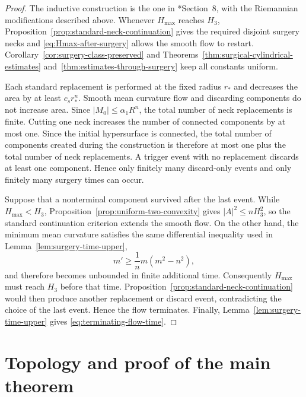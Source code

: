 \documentclass[11pt,reqno]{amsart}
\theoremstyle{definition}
\theoremstyle{remark}
\numberwithin{equation}{section}
\begin{document}
\begin{proof}
  The inductive construction is the one in \cite{HS09}*{Section~8}, with the
  Riemannian modifications described above.  Whenever $H_{\max}$ reaches
  $H_3$, Proposition~\ref{prop:standard-neck-continuation} gives the required
  disjoint surgery necks and
  \eqref{eq:Hmax-after-surgery} allows the smooth flow to restart.
  Corollary~\ref{cor:surgery-class-preserved} and
  Theorems~\ref{thm:surgical-cylindrical-estimates}
  and~\ref{thm:estimates-through-surgery} keep all constants uniform.

  Each standard replacement is performed at the fixed radius $r_*$ and
  decreases the area by at least $c_sr_*^n$.  Smooth mean curvature flow and
  discarding components do not increase area.  Since $|M_0|\leq\alpha_1R^n$,  
  the total number of neck replacements is finite.  Cutting one neck increases
  the number of connected components by at most one.  Since the initial
  hypersurface is connected, the total number of components created during
  the construction is therefore at most one plus the total number of neck
  replacements.  A trigger event with no replacement discards at least one
  component.  Hence only finitely many discard-only events and only finitely
  many surgery times can occur.

  Suppose that a nonterminal component survived after the last event.  While
  $H_{\max}<H_3$, Proposition~\ref{prop:uniform-two-convexity} gives
  $|A|^2\leq nH_3^2$, so the standard continuation criterion extends the
  smooth flow. On the other hand, the minimum mean curvature satisfies the same differential inequality used in Lemma~\ref{lem:surgery-time-upper},
\begin{equation*}
    m'\geq\frac1n m(m^2-n^2),
\end{equation*}
and therefore becomes unbounded in finite additional time.
Consequently $H_{\max}$ must reach $H_3$ before that time.
Proposition~\ref{prop:standard-neck-continuation} would then produce
another replacement or discard event, contradicting the choice of the
last event.  Hence the flow terminates.  Finally,
Lemma~\ref{lem:surgery-time-upper} gives
\eqref{eq:terminating-flow-time}.
\end{proof}

\section{Topology and proof of the main theorem}
\label{sec:topology}
\end{document}
